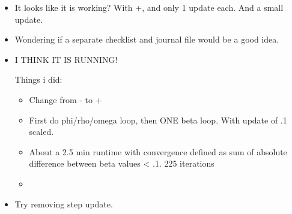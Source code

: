 \documentclass[10pt]{article}
\theoremstyle{definition}
\begin{document}
\begin{itemize}
\begin{verbatim}
[1] "alpha"
     Min.   1st Qu.    Median      Mean   3rd Qu.      Max.
  0.00000   0.01909   0.03678  14.95445   1.12921 298.57626
[1] "update"
      Min.    1st Qu.     Median       Mean    3rd Qu.       Max.
-1.1235722 -0.0005412  0.0009542  0.0000000  0.0171907  0.9020291
[1] "beta"
    Min.  1st Qu.   Median     Mean  3rd Qu.     Max.
-22.3197  -4.0244  -1.0600  -1.8396   0.4832   9.0991
[1] "Difference = 0.617539235770946"
[1] "Iteration: 25"
[1] "unstandardized residuals"
     Min.   1st Qu.    Median      Mean   3rd Qu.      Max.
   -17.46     -0.03      0.00    478.83      0.49 141859.99
[1] "standardized residuals"
      Min.    1st Qu.     Median       Mean    3rd Qu.       Max.
-7.960e-07 -2.000e-09  0.000e+00  2.182e-05  2.200e-08  6.464e-03
[1] "phi = 4.55692681244084e-08, omega  = 0.80541706862667 , rho = 4.31647868718837"
[1] "Beta iteration 1"
[1] "alpha"
     Min.   1st Qu.    Median      Mean   3rd Qu.      Max.
  0.00000   0.01909   0.03678  14.98010   1.12949 298.58490
[1] "update"
      Min.    1st Qu.     Median       Mean    3rd Qu.       Max.
-1.0765919 -0.0004804  0.0009014  0.0000000  0.0164077  0.8653577
[1] "beta"
    Min.  1st Qu.   Median     Mean  3rd Qu.     Max.
-22.3777  -4.0226  -1.0599  -1.8396   0.4836   9.0992
[1] "Difference = 0.590359570128033"

\end{verbatim}



\item It looks like it is working? With +, and only 1 update each. And a small update.

\item Wondering if a separate checklist and journal file would be a good idea.


\item I THINK IT IS RUNNING!

Things i did:

\begin{itemize}
  \item Change from - to +
  \item First do phi/rho/omega loop, then ONE beta loop. With update of .1 scaled.
  \item About a 2.5 min runtime with convergence defined as sum of absolute difference between beta values < .1. 225 iterations
  \item
\end{itemize}

\item Try removing step update.


\end{itemize}
\end{document}
